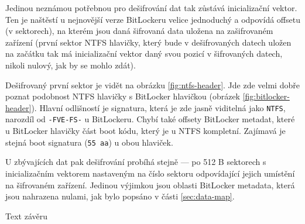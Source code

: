 Jedinou neznámou potřebnou pro dešifrování dat tak zůstává inicializační vektor. Ten je naštěstí u nejnovější verze BitLockeru velice jednoduchý a odpovídá offsetu (v sektorech), na kterém jsou daná šifrovaná data uložena na zašifrovaném zařízení (první sektor NTFS hlavičky, který bude v dešifrovaných datech uložen na začátku tak má inicializační vektor daný svou pozicí v šifrovaných datech, nikoli nulový, jak by se mohlo zdát).

Dešifrovaný první sektor je vidět na obrázku \ref{fig:ntfs-header}. Jde zde velmi dobře poznat podobnost NTFS hlavičky s BitLocker hlavičkou (obrázek \ref{fig:bitlocker-header}). Hlavní odlišností je signatura, která je zde jasně viditelná jako \texttt{NTFS}, narozdíl od \texttt{-FVE-FS-} u BitLockeru. Chybí také offsety BitLocker metadat, které u BitLocker hlavičky  část boot kódu, který je u NTFS kompletní. Zajímavá je stejná boot signatura (\texttt{55 aa}) u obou hlaviček.

U zbývajících dat pak dešifrování probíhá stejně --- po 512 B sektorech s inicializačním vektorem nastaveným na číslo sektoru odpovídající jejich umístění na šifrovaném zařízení. Jedinou výjimkou jsou oblasti BitLocker metadata, která jsou nahrazena nulami, jak bylo popsáno v části \ref{sec:data-map}.










Text závěru


